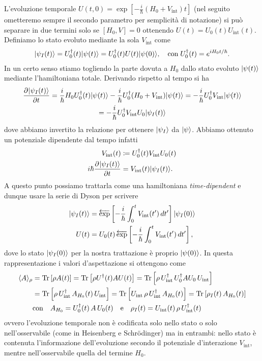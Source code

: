 L'evoluzione temporale $ U(t,0) = \exp\left[ - \frac{i}\hbar (H_0 + V_{\text{int}}) t \right] $ (nel seguito ometteremo sempre il secondo parametro 
per semplicità di notazione) si può separare in due termini solo se $ [H_0 , V] = 0 $ ottenendo $ U(t) = U_0(t) U_{\text{int}}(t) $. Definiamo 
lo stato evoluto mediante la sola $ V_{\text{int}} $ come 
\begin{align*}
  \vert \psi_I (t) \rangle = U^\dag_0(t) \vert \psi(t) \rangle = U^\dag_0(t) U(t) \vert \psi(0) \rangle, \quad \text{con}\; U_0^\dag(t) = e^{i H_0 t/\hbar}.
\end{align*}
In un certo senso stiamo togliendo la parte dovuta a $ H_0 $ dallo stato evoluto $ \vert \psi(t) \rangle $ mediante l'hamiltoniana totale. Derivando rispetto 
al tempo si ha 
\begin{gather}
  \frac{\partial^{} {\vert \psi_I(t) \rangle}}{\partial {t}^{}} = \frac{i}\hbar H_0 U_0^\dag(t) \vert \psi(t) \rangle - \frac{i}\hbar U_0^\dag (H_0 + V_{\text{int}}) \vert \psi(t) \rangle
  = -\frac{i}\hbar U_0^\dag V_{\text{int}} \vert \psi(t) \rangle 
  \\
  = -\frac{i}\hbar U_0^\dag V_{\text{int}} U_0 \vert \psi_I(t) \rangle 
\end{gather}
dove abbiamo invertito la relazione per ottenere $ \vert \psi_I \rangle $ da $ \vert \psi \rangle $. Abbiamo ottenuto un potenziale dipendente dal tempo infatti 
\begin{align*}
  V_{\text{int}}(t) &\coloneq U_0^\dag(t) V_{\text{int}} U_0(t)
  \\
  i \hbar\frac{\partial^{} {\vert \psi_I(t) \rangle}}{\partial {t}^{}} &= V_{\text{int}}(t) \vert \psi_I(t) \rangle.
\end{align*}
A questo punto possiamo trattarla come una hamiltoniana \textit{time-dipendent} e dunque usare la serie di Dyson per scrivere 
\begin{align*}
  \vert \psi_I(t) \rangle &= \mathop{\overleftarrow{\exp}}\nolimits\left[ -\frac{i}\hbar \int_0^t V_{\text{int}}(t')\,dt' \right] \vert \psi_I(0) \rangle
  \\
  U(t) &= U_0(t) \mathop{\overleftarrow{\exp}}\nolimits\left[ -\frac{i}\hbar \int_0^t V_{\text{int}}(t')\,dt' \right],
\end{align*}
dove lo stato $ \vert \psi_I(0) \rangle $ per la nostra trattazione è proprio $ \vert \psi(0) \rangle $. In questa rappresentazione i valori d'aspettazione si ottengono 
come 
\begin{align*}
  \langle A \rangle_\rho &= \operatorname{\textnormal{Tr}}\left[ \rho A(t) \right] = \operatorname{\textnormal{Tr}}\left[ \rho U^\dag(t) A U(t) \right] 
  = \operatorname{\textnormal{Tr}}\left[ \rho\, U_{\text{int}}^\dag \,U_0^\dag A U_0\, U_{\text{int}} \right]
  \\
  &= \operatorname{\textnormal{Tr}}\left[ \rho\, U_{\text{int}}^\dag \, A_{H_0}(t) \, U_{\text{int}} \right]
  = \operatorname{\textnormal{Tr}}\left[  U_{\text{int}} \,\rho\, U_{\text{int}}^\dag \, A_{H_0}(t) \right]
  = \operatorname{\textnormal{Tr}}\left[  \rho_I(t) \, A_{H_0}(t) \right]
  \\
  &\text{con} \quad A_{H_0} = U_0^\dag(t) \, A \, U_0(t) \quad \text{e} \quad \rho_I(t) = U_{\text{int}}(t) \,\rho\, U_{\text{int}}^\dag(t)
\end{align*}
ovvero l'evoluzione temporale non è codificata solo nello stato o solo nell'osservabile (come in Heisenberg e Schrödinger) ma in entrambi:
nello stato è contenuta l'informazione dell'evoluzione secondo il potenziale d'interazione $ V_{\text{int}} $, mentre nell'osservabile quella 
del termine $ H_0 $. 


